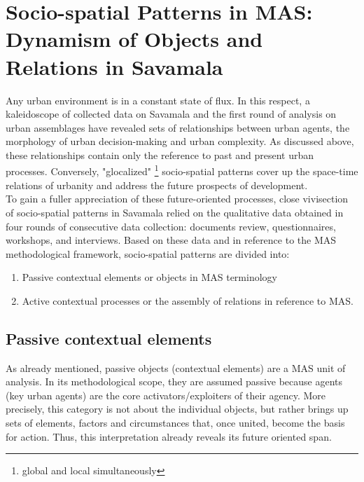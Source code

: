 \documentclass[11pt]{report}
\begin{document}
\section{Socio-spatial Patterns in MAS: Dynamism of Objects and Relations in Savamala}

Any urban environment is in a constant state of flux.
In this respect, a kaleidoscope of collected data on Savamala and the first round of analysis on urban assemblages have revealed sets of relationships between urban agents, the morphology of urban decision-making and urban complexity.
As discussed above, these relationships contain only the reference to past and present urban processes.
Conversely, "glocalized"
\footnote{global and local simultaneously}
socio-spatial patterns cover up the space-time relations of urbanity and address the future prospects of development.
\\

To gain a fuller appreciation of these future-oriented processes, close vivisection of socio-spatial patterns in Savamala relied on the qualitative data obtained in four rounds of consecutive data collection:
documents review, questionnaires, workshops, and interviews.
Based on these data and in reference to the MAS methodological framework, socio-spatial patterns are divided into:

\begin{enumerate}
\item Passive contextual elements or objects in MAS terminology
\item Active contextual processes or the assembly of relations in reference to MAS.
\end{enumerate}

\subsection{Passive contextual elements}

As already mentioned, passive objects (contextual elements) are a MAS unit of analysis. In its methodological scope, they are assumed passive because agents (key urban agents) are the core activators/exploiters of their agency. More precisely, this category is not about the individual objects, but rather brings up sets of elements, factors and circumstances that, once united, become the basis for action. Thus, this interpretation already reveals its future oriented span. 
\\
\end{document}
